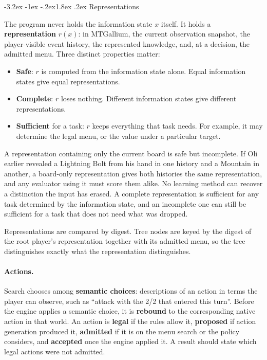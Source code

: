 \documentclass[11pt,a4paper]{article}
\makeatletter
\renewcommand\section{\@startsection{section}{1}{\z@}
  {-3.2ex \@plus -1ex \@minus -.2ex}{1.8ex \@plus .2ex}
  {\normalfont\Large\sffamily\bfseries\color{ink}}}
\theoremstyle{plain}
\theoremstyle{definition}
\newcommand{\term}[1]{\textbf{#1}}
\makeatother
\begin{document}
\section{Representations}
\label{sec:representations}

The program never holds the information state $x$ itself. It holds a
\term{representation} $r(x)$: in MTGallium, the current observation
snapshot, the player-visible event history, the represented knowledge, and,
at a decision, the admitted menu. Three distinct properties matter:
\begin{itemize}
\item \term{Safe}: $r$ is computed from the information state alone. Equal
  information states give equal representations.
\item \term{Complete}: $r$ loses nothing. Different information states give
  different representations.
\item \term{Sufficient} for a task: $r$ keeps everything that task needs.
  For example, it may determine the legal menu, or the value under a
  particular target.
\end{itemize}
A representation containing only the current board is safe but incomplete.
If Oli earlier revealed a Lightning Bolt from his hand in one history and a
Mountain in another, a board-only representation gives both histories the
same representation, and any evaluator using it must score them alike. No
learning method can recover a distinction the input has erased. A complete
representation is sufficient for any task determined by the information
state, and an incomplete one can still be sufficient for a task that does not
need what was dropped.

Representations are compared by digest. Tree nodes are keyed by the digest of
the root player's representation together with its admitted menu, so the tree
distinguishes exactly what the representation distinguishes.

\paragraph{Actions.} Search chooses among \term{semantic choices}: descriptions
of an action in terms the player can observe, such as ``attack with the 2/2
that entered this turn''. Before the engine applies a semantic choice, it is
\term{rebound} to the corresponding native action in that world. An action is
\term{legal} if the rules allow it, \term{proposed} if action generation
produced it, \term{admitted} if it is on the menu search or the policy
considers, and \term{accepted} once the engine applied it. A result should
state which legal actions were not admitted.
\end{document}
